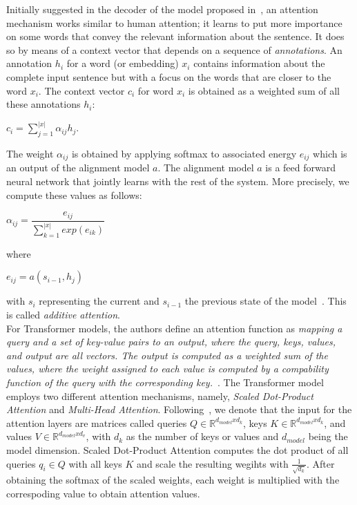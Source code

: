 Initially suggested in the decoder of the model proposed in~\parencite{NeuralMachineTranslationByJointlyLearning_Bahdanau}, an attention mechanism works similar to human attention; it learns to put more importance on some words that convey the relevant information about the sentence. It does so by means of a context vector that depends on a sequence of \emph{annotations}. An annotation $h_i$ for a word (or embedding) $x_i$ contains information about the complete input sentence but with a focus on the words that are closer to the word $x_i$. The context vector $c_i$ for word $x_i$ is obtained as a weighted sum of all these annotations $h_i$:
\begin{center}
    $c_i = \sum_{j=1}^{|x|} \alpha_{ij} h_j$.
\end{center}
The weight $\alpha_{ij}$ is obtained by applying softmax to associated energy $e_{ij}$ which is an output of the alignment model $a$. The alignment model $a$ is a feed forward neural network that jointly learns with the rest of the system. More precisely, we compute these values as follows:
\begin{center}
    $\alpha_{ij} = \dfrac{e_{ij}}{\sum_{k=1}^{|x|} exp(e_{ik})}$
\end{center}
where
\begin{center}
    $e_{ij} = a(s_{i-1}, h_j)$
\end{center}
with $s_i$ representing the current and $s_{i-1}$ the previous state of the
model~\parencite{NeuralMachineTranslationByJointlyLearning_Bahdanau}. This is called \emph{additive attention}.\\
For Transformer models, the authors define an attention function as \emph{mapping a query and a set of key-value pairs to an output, where the query, keys, values, and output are all vectors. The output is computed as a weighted sum of the values, where the weight assigned to each value is computed by a compability function of the query with the corresponding key.}~\parencite{AttentionIsAllYouNeed_Vaswani}. The Transformer model employs two different attention mechanisms, namely, \emph{Scaled Dot-Product Attention} and \emph{Multi-Head Attention}. Following~\parencite{AttentionIsAllYouNeed_Vaswani}, we denote that the input for the attention layers are matrices called queries $Q \in \mathbb{R}^{d_{model}xd_k}$, keys $K \in \mathbb{R}^{d_{model}xd_k}$, and values $V \in \mathbb{R}^{d_{model}xd_v}$, with $d_k$ as the number of keys or values and $d_{model}$ being the model dimension. Scaled Dot-Product Attention computes the dot product of all queries $q_i \in Q$ with all keys $K$ and scale the resulting wegihts with $\frac{1}{\sqrt{d_k}}$. After obtaining the softmax of the scaled weights, each weight is multiplied with the correspoding value to obtain attention values.
